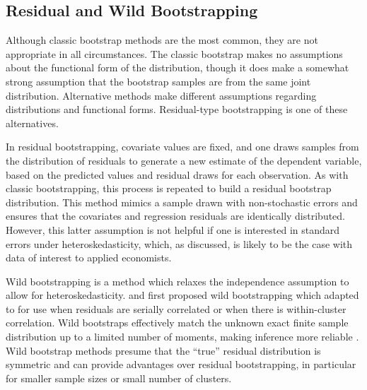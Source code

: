 \documentclass[11pt]{article}
\begin{document}

\subsection{Residual and Wild Bootstrapping}

Although classic bootstrap methods are the most common, they are not appropriate in all circumstances. The classic bootstrap makes no assumptions about the functional form of the distribution, though it does make a somewhat strong assumption that the bootstrap samples are from the same joint distribution. Alternative methods make different assumptions regarding distributions and functional forms. Residual-type bootstrapping is one of these alternatives.

In residual bootstrapping, covariate values are fixed, and one draws samples from the distribution of residuals to generate a new estimate of the dependent variable, based on the predicted values and residual draws for each observation. As with classic bootstrapping, this process is repeated to build a residual bootstrap distribution. This method mimics a sample drawn with non-stochastic errors and ensures that the covariates and regression residuals are identically distributed. However, this latter assumption is not helpful if one is interested in standard errors under heteroskedasticity, which, as discussed, is likely to be the case with data of interest to applied economists.

Wild bootstrapping is a method which relaxes the independence assumption to allow for heteroskedasticity. \cite{wu_jacknife_1986} and \cite{liu_bootstrap_1988} first proposed wild bootstrapping which \cite{cameron_bootstrap-based_2008} adapted to for use when residuals are serially correlated or when there is within-cluster correlation. Wild bootstraps effectively match the unknown exact finite sample distribution up to a limited number of moments, making inference more reliable \citep{mackinnon_bootstrap_2006}. Wild bootstrap methods presume that the ``true'' residual distribution is symmetric and can provide advantages over residual bootstrapping, in particular for smaller sample sizes or small number of clusters. 
\end{document}
